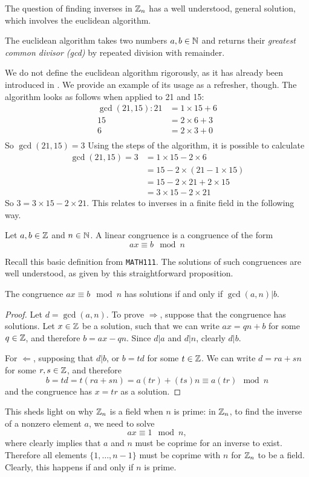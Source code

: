 The question of finding inverses in $\mathbb{Z}_{n}$ has a well understood, general solution, which involves the euclidean algorithm.
\begin{definition}
	The euclidean algorithm takes two numbers $a,b \in \mathbb{N}$ and returns their \emph{greatest common divisor (gcd)} by repeated division with remainder.
\end{definition}
We do not define the euclidean algorithm rigorously, as it has already been introduced in \cite{111-lectures}.
We provide an example of its usage as a refresher, though.
The algorithm looks as follows when applied to 21 and 15:
\begin{align*}
	\gcd(21,15):21 &= 1\times15 + 6\\
	15 &= 2\times6 + 3\\
	6 &= 2\times3 + 0\\
\end{align*}
So $\gcd(21,15)=3$
Using the steps of the algorithm, it is possible to calculate
\begin{align*}
	\gcd(21,15) = 3 &= 1\times15 - 2\times6\\
	&= 15 - 2\times(21 - 1\times15)\\
	&= 15 - 2\times21 + 2\times15\\
	&=3\times15 - 2\times21
\end{align*}
So $3 = 3\times15 - 2\times21$.
This relates to inverses in a finite field in the following way.
\begin{definition}
	Let $a,b \in \mathbb{Z}$ and $n \in \mathbb{N}$.
	A linear congruence is a congruence of the form
	$$ax \equiv b \mod n$$
\end{definition}
Recall this basic definition from \texttt{MATH111}.
The solutions of such congruences are well understood, as given by this straightforward proposition.
\begin{proposition}
	The congruence $ax \equiv b \mod n$ has solutions if and only if $\gcd(a,n)|b$.\label{congruencesolutions}
\end{proposition}
\begin{proof}
	Let $d = \gcd(a,n)$.
	To prove $\Rightarrow$, suppose that the congruence has solutions.
	Let $x \in \mathbb{Z}$ be a solution, such that we can write $ax = qn + b$ for some $q \in \mathbb{Z}$, and therefore $b = ax - qn$.
	Since $d|a$ and $d|n$, clearly $d|b$.

	For  $\Leftarrow$, supposing that $d|b$, or $b=td$ for some $t \in \mathbb{Z}$.
	We can write $d = ra + sn$ for some $r,s \in \mathbb{Z}$, and therefore
	$$b = td = t(ra + sn) = a(tr) + (ts)n \equiv a(tr) \mod n$$
	and the congruence has $x = tr$ as a solution.
\end{proof}
This sheds light on why $\mathbb{Z}_{n}$ is a field when $n$ is prime: in $\mathbb{Z}_{n}$, to find the inverse of a nonzero element $a$, we need to solve
$$ax \equiv 1 \mod n,$$
where  clearly implies that $a$ and $n$ must be coprime for an inverse to exist.
Therefore all elements $\{1,\ldots,n-1\}$ must be coprime with $n$ for $\mathbb{Z}_{n}$ to be a field.
Clearly, this happens if and only if $n$ is prime.

